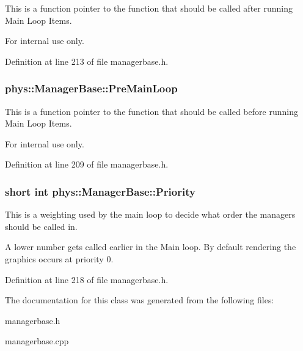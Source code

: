 This is a function pointer to the function that should be called after running Main Loop Items. 

\begin{DoxyInternal}{For internal use only.}
\end{DoxyInternal}


Definition at line 213 of file managerbase.h.

\hypertarget{classphys_1_1ManagerBase_a93eb2f1a30d913a4e99180b0965eb5db}{
\subsubsection[{PreMainLoop}]{ {\bf phys::ManagerBase::PreMainLoop}}}
\label{d2/de3/classphys_1_1ManagerBase_a93eb2f1a30d913a4e99180b0965eb5db}


This is a function pointer to the function that should be called before running Main Loop Items. 

\begin{DoxyInternal}{For internal use only.}
\end{DoxyInternal}


Definition at line 209 of file managerbase.h.

\hypertarget{classphys_1_1ManagerBase_a28e2690fbcf644a7780a53b81821d8ef}{
\subsubsection[{Priority}]{\setlength{\rightskip}{0pt plus 5cm}short int {\bf phys::ManagerBase::Priority}}}
\label{d2/de3/classphys_1_1ManagerBase_a28e2690fbcf644a7780a53b81821d8ef}


This is a weighting used by the main loop to decide what order the managers should be called in. 

A lower number gets called earlier in the Main loop. By default rendering the graphics occurs at priority 0. 

Definition at line 218 of file managerbase.h.



The documentation for this class was generated from the following files:\begin{DoxyCompactItemize}
\item 
managerbase.h\item 
managerbase.cpp\end{DoxyCompactItemize}
